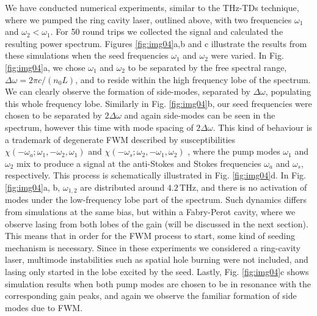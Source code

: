 \documentclass[10pt,letterpaper]{article}%
\begin{document}
We have conducted numerical experiments, similar to the THz-TDs technique,
where we pumped the ring cavity laser, outlined above, with two frequencies
$\omega_{1}$ and $\omega_{2}<\omega_{1}$. For 50 round trips we collected the
signal and calculated the resulting power spectrum. Figures \ref{fig:img04}a,b
and c illustrate the results from these simulations when the seed frequencies
$\omega_{1}$ and $\omega_{2}$ were varied. In Fig. \ref{fig:img04}a, we chose
$\omega_{1}$ and $\omega_{2}$ to be separated by the free spectral range,
$\Delta\omega=2\pi c/\left(  n_{0}L\right)  $, and to reside within the high
frequency lobe of the spectrum. We can clearly observe the formation of
side-modes, separated by $\Delta\omega$, populating this whole frequency lobe.
Similarly in Fig. \ref{fig:img04}b, our seed frequencies were chosen to be
separated by $2\Delta\omega$ and again side-modes can be seen in the spectrum,
however this time with mode spacing of $2\Delta\omega$. This kind of behaviour
is a trademark of degenerate FWM described by susceptibilities $\chi
(-\omega_{a};\omega_{1},-\omega_{2},\omega_{1})$ and $\chi(-\omega_{s}%
;\omega_{2},-\omega_{1},\omega_{2})$ \cite{butcher1991elements}, where the
pump modes $\omega_{1}$ and $\omega_{2}$ mix to produce a signal at the
anti-Stokes and Stokes frequencies $\omega_{a}$ and $\omega_{s}$,
respectively. This process is schematically illustrated in Fig.
\ref{fig:img04}d. In Fig. \ref{fig:img04}a, b, $\omega_{1,2}$ are distributed
around $4.2{\,}\mathrm{THz}$, and there is no activation of modes under the
low-frequency lobe part of the spectrum. Such dynamics differs from simulations 
at the same bias, but within a Fabry-Perot cavity, where we observe lasing 
from both lobes of the gain (will be discussed in the next section). 
This means that in order for the FWM process to start, some kind of
seeding mechanism is necessary. Since in these experiments we considered a
ring-cavity laser, multimode instabilities such as spatial hole burning
\cite{gordon2008multimode} were not included, and lasing only started in the
lobe excited by the seed.\textrm{ }Lastly, Fig. \ref{fig:img04}c shows
simulation results when both pump modes are chosen to be in resonance with the
corresponding gain peaks, and again we observe the familiar formation of side
modes due to FWM.
\end{document}

